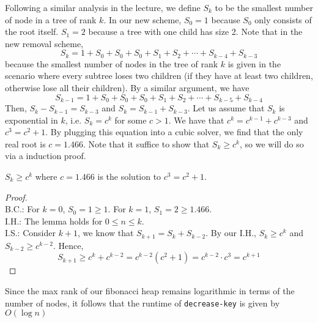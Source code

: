 \documentclass[a4paper]{/Users/dawei/.dotfiles/templates/preamble}
\begin{document}
Following a similar analysis in the lecture, we define $S_k$ to be the smallest
number of node in a tree of rank $k$. In our new scheme, $S_0 = 1$ because
$S_0$ only consists of the root itself. $S_1 = 2$ because a tree with one child
has size 2. Note that in the new removal scheme,
\[
  S_k = 1 + S_0 + S_0 + S_0 + S_1 + S_2 + \cdots + S_{k-4} + S_{k-3}
\]
because the smallest number of nodes in the tree of rank $k$ is given in the
scenario where every subtree loses two children (if they have at least two
children, otherwise lose all their children). By a similar argument, we have
\[
  S_{k-1} = 1 + S_0 + S_0 + S_0 + S_1 + S_2 + \cdots + S_{k-5} + S_{k-4}
\]
Then, $S_k - S_{k-1} = S_{k-3}$ and $S_{k} = S_{k-1} + S_{k-3}$. Let us assume
that $S_k$ is exponential in $k$, i.e. $S_k = c^k$ for some $c > 1$.
We have that $c^k = c^{k-1} + c^{k-3}$ and $c^3 = c^2 + 1$. By plugging this
equation into a cubic solver, we find that the only real root is $c = 1.466$.
Note that it suffice to show that $S_k \ge c^k$, so we will do so via
a induction proof.
\begin{lemma}{}{}
  $S_k \ge c^k$ where $c = 1.466$ is the solution to $c^3 = c^2 + 1$.
\end{lemma}
\begin{proof}{}{} \\
  B.C.: For $k = 0$, $S_0 = 1 \ge 1$. For $k = 1$, $S_1 = 2 \ge 1.466$. \\
  I.H.: The lemma holds for $0 \le n \le k$. \\
  I.S.: Consider $k+1$, we know that $S_{k+1} = S_{k} + S_{k-2}$.
  By our I.H., $S_k \ge c^k$ and $S_{k-2} \ge c^{k-2}$.
  Hence, 
  \[
    S_{k+1} \ge c^k + c^{k-2} = c^{k-2}(c^{2} + 1) = c^{k-2} \cdot c^{3} = c^{k+1}
  \]
\end{proof}
Since the max rank of our fibonacci heap remains logarithmic in terms of the number of nodes,
it follows that the runtime of \texttt{decrease-key} is given by $O(\log{n})$
\end{document}
